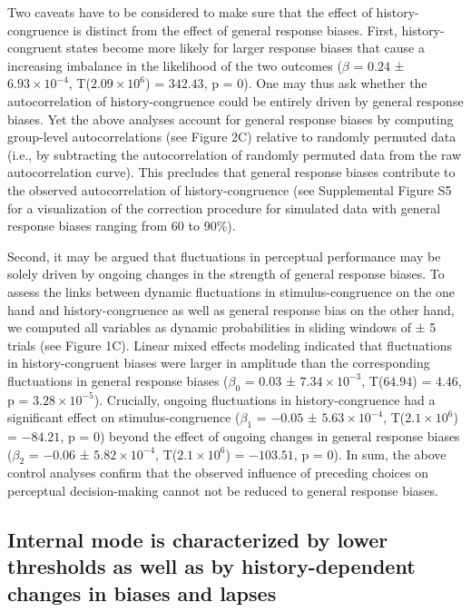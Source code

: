 \documentclass[
]{article}
\begin{document}
Two caveats have to be considered to make sure that the effect of
history-congruence is distinct from the effect of general response
biases. First, history-congruent states become more likely for larger
response biases that cause a increasing imbalance in the likelihood of
the two outcomes (\(\beta\) = \(0.24\) ±
\(\ensuremath{6.93\times 10^{-4}}\),
T(\(\ensuremath{2.09\times 10^{6}}\)) = \(342.43\), p = \(0\)). One may
thus ask whether the autocorrelation of history-congruence could be
entirely driven by general response biases. Yet the above analyses
account for general response biases by computing group-level
autocorrelations (see Figure 2C) relative to randomly permuted data
(i.e., by subtracting the autocorrelation of randomly permuted data from
the raw autocorrelation curve). This precludes that general response
biases contribute to the observed autocorrelation of history-congruence
(see Supplemental Figure S5 for a visualization of the correction
procedure for simulated data with general response biases ranging from
60 to 90\%).

Second, it may be argued that fluctuations in perceptual performance may
be solely driven by ongoing changes in the strength of general response
biases. To assess the links between dynamic fluctuations in
stimulus-congruence on the one hand and history-congruence as well as
general response bias on the other hand, we computed all variables as
dynamic probabilities in sliding windows of ± 5 trials (see Figure 1C).
Linear mixed effects modeling indicated that fluctuations in
history-congruent biases were larger in amplitude than the corresponding
fluctuations in general response biases (\(\beta_0\) = \(0.03\) ±
\(\ensuremath{7.34\times 10^{-3}}\), T(\(64.94\)) = \(4.46\), p =
\(\ensuremath{3.28\times 10^{-5}}\)). Crucially, ongoing fluctuations in
history-congruence had a significant effect on stimulus-congruence
(\(\beta_1\) = \(-0.05\) ± \(\ensuremath{5.63\times 10^{-4}}\),
T(\(\ensuremath{2.1\times 10^{6}}\)) = \(-84.21\), p = \(0\)) beyond the
effect of ongoing changes in general response biases (\(\beta_2\) =
\(-0.06\) ± \(\ensuremath{5.82\times 10^{-4}}\),
T(\(\ensuremath{2.1\times 10^{6}}\)) = \(-103.51\), p = \(0\)). In sum,
the above control analyses confirm that the observed influence of
preceding choices on perceptual decision-making cannot not be reduced to
general response biases.

\hypertarget{internal-mode-is-characterized-by-lower-thresholds-as-well-as-by-history-dependent-changes-in-biases-and-lapses}{%
\subsection{Internal mode is characterized by lower thresholds as well
as by history-dependent changes in biases and
lapses}\label{internal-mode-is-characterized-by-lower-thresholds-as-well-as-by-history-dependent-changes-in-biases-and-lapses}}
\end{document}
